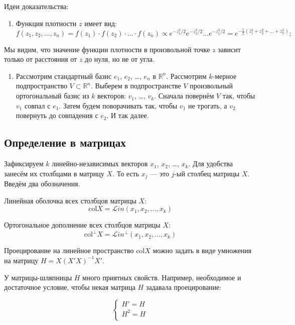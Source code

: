 \documentclass[11pt,russian,]{article}
\providecommand{\tightlist}{%
  \setlength{\itemsep}{0pt}\setlength{\parskip}{0pt}}
\newcommand{\RR}{\mathbb{R}}
\renewcommand{\Rn}{\RR^n}
\newcommand{\1}{\mathbbm{1}}
\newcommand{\Lin}{\mathcal{L}in}
\newcommand{\Linp}{\Lin^{\perp}}
\newcommand{\col}{\mathcal{col}}
\newcommand{\colp}{\col^{\perp}}
\renewcommand{\col}{\mathrm{col}}
\begin{document}
Идеи доказательства:

\begin{enumerate}
\def\labelenumi{\arabic{enumi}.}
\tightlist
\item
  Функция плотности \(z\) имеет вид: \[
  f(z_1, z_2, \ldots, z_n) = f(z_1) \cdot f(z_2)\cdot \ldots \cdot f(z_n) \propto e^{-z_1^2/2}e^{-z_2^2/2}\ldots e^{-z_1^2/2} = e^{-\frac{1}{2}(z_1^2 + z_2^2 +\ldots +z_n^2)};
  \]
\end{enumerate}

Мы видим, что значение функции плотности в произвольной точке \(z\)
зависит только от расстояния от \(z\) до нуля, но не от угла.

\begin{enumerate}
\def\labelenumi{\arabic{enumi}.}
\setcounter{enumi}{1}
\tightlist
\item
  Рассмотрим стандартный базис \(e_1\), \(e_2\), \ldots, \(e_n\) в
  \(\Rn\). Рассмотрим \(k\)-мерное подпространство \(V \subset \Rn\).
  Выберем в подпространстве \(V\) произвольный ортогональный базис из
  \(k\) векторов: \(v_1\), \ldots, \(v_k\). Сначала повернём \(V\) так,
  чтобы \(v_1\) совпал с \(e_1\). Затем будем поворачивать так, чтобы
  \(v_1\) не трогать, а \(v_2\) повернуть до совпадения с \(e_2\). И так
  далее.
\end{enumerate}

\subsection{Определение в матрицах}\label{--}

Зафиксируем \(k\) линейно-независимых векторов \(x_1\), \(x_2\), \ldots,
\(x_k\). Для удобства занесём их столбцами в матрицу \(X\). То есть
\(x_j\) --- это \(j\)-ый столбец матрицы \(X\). Введём два обозначения.

Линейная оболочка всех столбцов матрицы \(X\): \[
\col X = \Lin(x_1, x_2, \ldots, x_k)
\]

Ортогональное дополнение всех столбцов матрицы \(X\): \[
\colp X = \Linp(x_1, x_2, \ldots, x_k)
\]

Проецирование на линейное пространство \(\col X\) можно задать в виде
умножения на матрицу \(H=X(X'X)^{-1}X'\).

У матрицы-шляпницы \(H\) много приятных свойств. Например, необходимое и
достаточное условие, чтобы некая матрица \(H\) задавала проецирование:

\[
\begin{cases}
H' = H \\
H^2 = H \\
\end{cases}
\]
\end{document}
